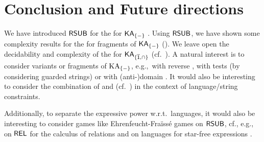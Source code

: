 \section{Conclusion and Future directions}\label{section: conclusion}
We have introduced $\mathsf{RSUB}$ for the  for $\mathsf{KA}_{\{-\}}$ .
Using $\mathsf{RSUB}$, we have shown some complexity results for the  for fragments of $\mathsf{KA}_{\{-\}}$  ().
We leave open the decidability and complexity of the  for $\mathsf{KA}_{\{\overline{\mathsf{1}}, \cap\}}$ (cf.\ ).
A natural interest is to consider variants or fragments of $\mathrm{KA}_{\{-\}}$, e.g.,\ with reverse \cite{bloomNotesEquationalTheories1995}, with tests \cite{kozenKleeneAlgebraTests1996} (by considering guarded strings) or with (anti-)domain \cite{desharnaisKleeneAlgebraDomain2006}.
It would also be interesting to consider the combination of  and  (cf.\ ) in the context of language/string constraints.

Additionally, to separate the expressive power w.r.t.\ languages,
it would also be interesting to consider games like Ehrenfeucht-Fra{\"i}ss{\'e} games \cite{ehrenfeuchtApplicationGamesCompleteness1961,fraisseClassificationsSystemsRelations1954} on $\mathsf{RSUB}$, cf., e.g., on $\mathsf{REL}$ for the calculus of relations \cite{nakamuraExpressivePowerSuccinctness2022} and on languages for star-free expressions \cite{thomasConcatenationGameDotdepth1987}.


